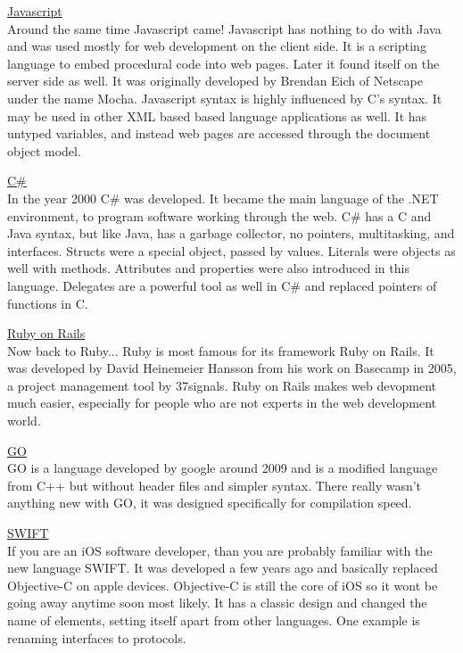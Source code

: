 \documentclass[letterpaper, 10 pt, conference]{IEEEtran}
\begin{document}
\noindent \underline{Javascript}\\
Around the same time Javascript came! Javascript has nothing to do with Java and was used mostly for web development on the client side. It is a scripting language to embed procedural code into web pages. Later it found itself on the server side as well. It was originally developed by Brendan Eich of Netscape under the name Mocha. Javascript syntax is highly influenced by C's syntax. It may be used in other XML based based language applications as well. It has untyped variables, and instead web pages are accessed through the document object model.  \bigskip

\noindent \underline{C\#}\\
In the year 2000 C\# was developed. It became the main language of the .NET environment, to program software working through the web. C\# has a C and Java syntax, but like Java, has a garbage collector, no pointers, multitasking, and interfaces. Structs were a special object, passed by values. Literals were objects as well with methods. Attributes and properties were also introduced in this language. Delegates are a powerful tool as well in C\# and replaced pointers of functions in C. \bigskip

\noindent \underline{Ruby on Rails}\\
Now back to Ruby... Ruby is most famous for its framework Ruby on Rails. It was developed by David Heinemeier Hansson from his work on Basecamp in 2005, a project management tool by 37signals. Ruby on Rails makes web devopment much easier, especially for people who are not experts in the web development world. \bigskip

\noindent \underline{GO}\\
GO is a language developed by google around 2009 and is a modified language from C++ but without header files and simpler syntax. There really wasn't anything new with GO, it was designed specifically for compilation speed. \bigskip

\noindent \underline{SWIFT}\\
If you are an iOS software developer, than you are probably familiar with the new language SWIFT. It was developed a few years ago and basically replaced Objective-C on apple devices. Objective-C is still the core of iOS so it wont be going away anytime soon most likely. It has a classic design and changed the name of elements, setting itself apart from other languages. One example is renaming interfaces to protocols.
\bigskip
\end{document}
